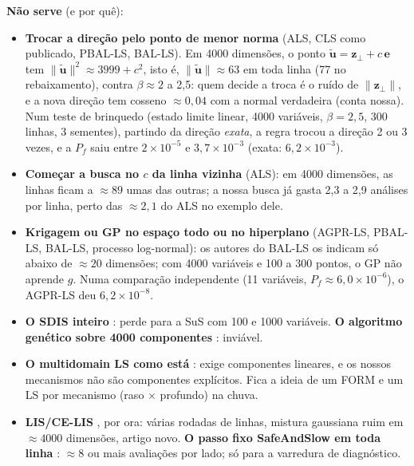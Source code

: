 \documentclass[11pt,a4paper]{article}
\newcommand{\sci}[2]{\ensuremath{#1\times10^{#2}}}
\begin{document}
\textbf{Não serve} (e por quê):
\begin{itemize}
  \item \textbf{Trocar a direção pelo ponto de menor norma} (ALS, CLS como publicado, PBAL-LS, BAL-LS). Em 4000
    dimensões, o ponto $\tilde{\bm u} = \bm z_\perp + c\,\bm e$ tem $\lVert\tilde{\bm u}\rVert^2 \approx 3999 + c^2$,
    isto é, $\lVert\tilde{\bm u}\rVert \approx 63$ em toda linha (77 no rebaixamento), contra $\beta \approx 2$ a 2,5:
    quem decide a troca é o ruído de $\lVert\bm z_\perp\rVert$, e a nova direção tem cosseno $\approx 0{,}04$ com a
    normal verdadeira (conta nossa). Num teste de brinquedo (estado limite linear, 4000 variáveis, $\beta = 2{,}5$, 300
    linhas, 3 sementes), partindo da direção \emph{exata}, a regra trocou a direção 2 ou 3 vezes, e a $P_f$ saiu entre
    \sci{2}{-5} e \sci{3{,}7}{-3} (exata: \sci{6{,}2}{-3}).
  \item \textbf{Começar a busca no $c$ da linha vizinha} (ALS): em 4000 dimensões, as linhas ficam a $\approx 89$ umas
    das outras; a nossa busca já gasta 2,3 a 2,9 análises por linha, perto das $\approx 2{,}1$ do ALS no exemplo dele.
  \item \textbf{Krigagem ou GP no espaço todo ou no hiperplano} (AGPR-LS, PBAL-LS, BAL-LS, processo log-normal): os
    autores do BAL-LS os indicam só abaixo de $\approx 20$ dimensões; com 4000 variáveis e 100 a 300 pontos, o GP não
    aprende $g$.
    Numa comparação independente (11 variáveis, $P_f \approx \sci{6{,}0}{-6}$), o AGPR-LS deu \sci{6{,}2}{-8}.
  \item \textbf{O SDIS inteiro} \citep{cheng2025}: perde para a SuS com 100 e 1000 variáveis. \textbf{O algoritmo
    genético sobre 4000 componentes} \citep{zio2010}: inviável.
  \item \textbf{O multidomain LS como está} \citep{valdebenito2021}: exige componentes lineares, e os nossos mecanismos
    não são componentes explícitos. Fica a ideia de um FORM e um LS por mecanismo (raso $\times$ profundo) na chuva.
  \item \textbf{LIS/CE-LIS} \citep{zhang2026}, por ora: várias rodadas de linhas, mistura gaussiana ruim em
    $\approx 4000$ dimensões, artigo novo. \textbf{O passo fixo SafeAndSlow em toda linha} \citep{openturns}: $\approx 8$
    ou mais avaliações por lado; só para a varredura de diagnóstico.
\end{itemize}
\end{document}
